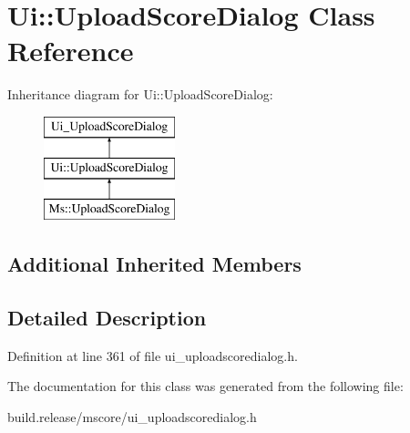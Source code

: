 \hypertarget{class_ui_1_1_upload_score_dialog}{}\section{Ui\+:\+:Upload\+Score\+Dialog Class Reference}
\label{class_ui_1_1_upload_score_dialog}
Inheritance diagram for Ui\+:\+:Upload\+Score\+Dialog\+:\begin{figure}[H]
\begin{center}
\leavevmode
\includegraphics[height=3.000000cm]{class_ui_1_1_upload_score_dialog}
\end{center}
\end{figure}
\subsection*{Additional Inherited Members}


\subsection{Detailed Description}


Definition at line 361 of file ui\+\_\+uploadscoredialog.\+h.



The documentation for this class was generated from the following file\+:\begin{DoxyCompactItemize}
\item 
build.\+release/mscore/ui\+\_\+uploadscoredialog.\+h\end{DoxyCompactItemize}
